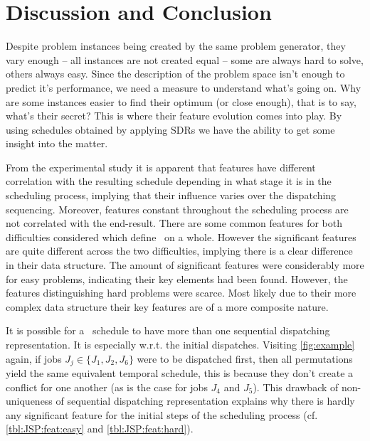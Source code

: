\subsection{\Fjc}\label{sec:diff:fjc}
\subsection{\Fmc}\label{sec:diff:fmc}
\subsection{\Fmxc}\label{sec:diff:fmxc}


\section{Discussion and Conclusion}
Despite problem instances being created by the same problem generator, they vary enough -- all instances are not created equal -- some are always hard to solve, others always easy. 
Since the description of the problem space isn't enough to predict it's performance, we need a measure to understand what's going on. Why are some instances easier to find their optimum (or close enough), that is to say, what's their secret? This is where their feature evolution comes into play.
By using schedules obtained by applying SDRs we have the ability to get some insight into the matter. 

From the experimental study it is apparent that features have different %
correlation with the resulting schedule depending in what stage it is in the scheduling process, implying that their influence varies over the dispatching sequencing. Moreover, features constant throughout the scheduling process are not correlated with the end-result.
There are some common features for both difficulties considered which define \JSP\ on a whole. However the significant features are quite different across the two difficulties, implying there is a clear difference in their data structure. The amount of significant features were considerably more for easy problems, indicating their key elements had been found. However, the features distinguishing hard problems were scarce. Most likely due to their more complex data structure their key features are of a more composite nature.

It is possible for a \JSP\ schedule to have more than one sequential dispatching representation. It is especially w.r.t. the initial dispatches. Visiting \cref{fig:example} again, if jobs $J_j\in\{J_1,J_2,J_6\}$ were to be dispatched first, then all permutations yield the same equivalent temporal schedule, this is because they don't create a conflict for one another (as is the case for jobs $J_4$ and $J_5$). This drawback of non-uniqueness of sequential dispatching representation explains why there is hardly any significant feature for the initial steps of the scheduling process (cf. \cref{tbl:JSP:feat:easy} and \cref{tbl:JSP:feat:hard}). 


